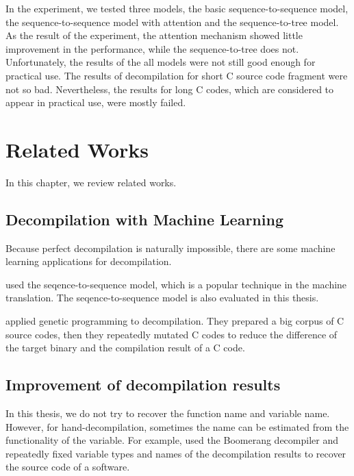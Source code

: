 \documentclass[11pt]{jarticle}
\begin{document}
In the experiment, we tested three models, the basic sequence-to-sequence model, the sequence-to-sequence model with attention and the sequence-to-tree model.
As the result of the experiment, the attention mechanism showed little improvement in the performance, while the sequence-to-tree does not.
Unfortunately, the results of the all models were not still good enough for practical use.
The results of decompilation for short C source code fragment were not so bad. 
Nevertheless, the results for long C codes, which are considered to appear in practical use, were mostly failed.


\chapter{Related Works}
In this chapter, we review related works.

\section{Decompilation with Machine Learning}

Because perfect decompilation is naturally impossible, there are some machine learning applications for decompilation.

\citet{Motoneta} used the seqence-to-sequence model, which is a popular technique in the machine translation.
The seqence-to-sequence model is also evaluated in this thesis.

\citet{genetic_decompiler} applied genetic programming to decompilation.
They prepared a big corpus of C source codes, then they repeatedly mutated C codes to reduce the difference of the target binary and the compilation result of a C code. 



% 

\section{Improvement of decompilation results}
In this thesis, we do not try to recover the function name and variable name. 
However, for hand-decompilation, sometimes the name can be estimated from the functionality of the variable.
For example, \citet{hand_decompilation} used the Boomerang decompiler and repeatedly fixed variable types and names of the decompilation results 
to recover the source code of a software.
\end{document}
